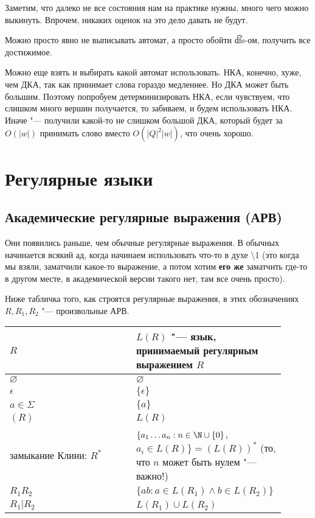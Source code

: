 \begin{Rem}
Заметим, что далеко не все состояния нам на практике нужны, много чего можно выкинуть. Впрочем, никаких оценок на это дело давать не будут.

Можно просто явно не выписывать автомат, а просто обойти \t{dfs}-ом, получить все достижимое.

Можно еще взять и выбирать какой автомат использовать. 
НКА, конечно, хуже, чем ДКА, так как принимает слова гораздо медленнее. Но ДКА может быть большим. 
Поэтому попробуем детерминизировать НКА, если чувствуем, что слишком много вершин получается, то забиваем, и будем использовать НКА. 
Иначе "--- получили какой-то не слишком большой ДКА, который будет за $O(|w|)$ принимать слово вместо $O(|Q|^2|w|)$, что очень хорошо.
\end{Rem}


\section{Регулярные языки}
\subsection{Академические регулярные выражения (АРВ)}
Они появились раньше, чем обычные регулярные выражения. В обычных начинается всякий ад, когда начинаем использовать что-то в духе \textbackslash1
(это когда мы взяли, заматчили какое-то выражение, а потом хотим \textbf{его же} заматчить где-то в другом месте, в академической версии такого нет, там все очень просто).

Ниже табличка того, как строятся регулярные выражения, в этих обозначениях $R, R_1, R_2$ "--- произвольные АРВ.

\begin{tabular}{p{0.45\linewidth}|p{0.45\linewidth}}
$R$ & $L(R)$ "--- язык, принимаемый регулярным выражением $R$ \\
\hline
$\varnothing$ & $\varnothing$ \\
$\epsilon$ & $\{\epsilon\}$ \\
$a \in \Sigma$ & $\{a\}$ \\
$(R)$ & $L(R)$ \\
замыкание Клини: $R^*$ & $\{a_1 \dots a_n: n \in \N \cup \{0\}$, $a_i \in L(R)\} = (L(R))^*$ (то, что $n$ может быть нулем "--- важно!) \\
$R_1R_2$ & $\{ab: a \in L(R_1) \land b \in L(R_2)\}$ \\
$R_1 | R_2$ & $L(R_1) \cup L(R_2)$
\end{tabular}

